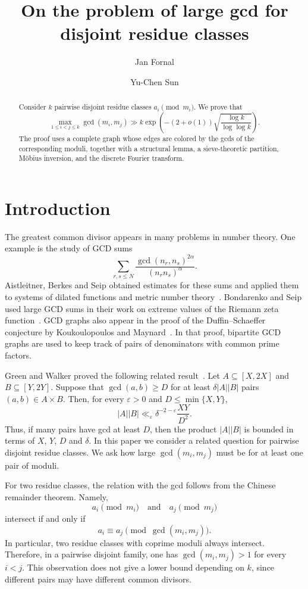 \documentclass[11pt]{amsart}
\title{On the problem of large gcd for disjoint residue classes}
\author{Jan Fornal}
\author{Yu-Chen Sun}
\date{}
\theoremstyle{remark}
\begin{document}
\begin{abstract}
  Consider $k$ pairwise disjoint residue classes $a_i \pmod{m_i}$. We prove
  that
  \[
    \max_{1\leq i<j\leq k}\gcd(m_i,m_j)
    \gg k\exp\!\left(-(2+o(1))
      \sqrt{\frac{\log k}{\log\log k}}\right).
  \]
  The proof uses a complete graph whose edges are colored by the gcds of the
  corresponding moduli, together with a structural lemma, a sieve-theoretic
  partition, M\"obius inversion, and the discrete Fourier transform.
\end{abstract}

\maketitle

\section{Introduction}

The greatest common divisor appears in many problems in number theory.  One
example is the study of GCD sums
\[
  \sum_{r,s\leq N}
  \frac{\gcd(n_r,n_s)^{2\alpha}}{(n_rn_s)^\alpha}.
\]
Aistleitner, Berkes and Seip obtained estimates for these sums and applied
them to systems of dilated functions and metric number
theory~\cite{aistleitner-berkes-seip2015}.  Bondarenko and Seip used large GCD
sums in their work on extreme values of the Riemann zeta
function~\cite{bondarenko-seip2017}.  GCD graphs also appear in the proof of
the Duffin--Schaeffer conjecture by Koukoulopoulos and
Maynard~\cite{koukoulopoulos-maynard2020}.  In that proof, bipartite GCD graphs
are used to keep track of pairs of denominators with common prime factors.

Green and Walker proved the following related result~\cite{green-walker2021}.
Let $A\subseteq[X,2X]$ and $B\subseteq[Y,2Y]$.  Suppose that
$\gcd(a,b)\geq D$ for at least $\delta|A||B|$ pairs
$(a,b)\in A\times B$.  Then, for every $\varepsilon>0$ and
$D\leq\min\{X,Y\}$,
\[
  |A||B|\ll_\varepsilon
  \delta^{-2-\varepsilon}\frac{XY}{D^2}.
\]
Thus, if many pairs have gcd at least $D$, then the product $|A||B|$ is
bounded in terms of $X$, $Y$, $D$ and $\delta$.  In this paper we consider a
related question for pairwise disjoint residue classes.  We ask how large
$\gcd(m_i,m_j)$ must be for at least one pair of moduli.

For two residue classes, the relation with the gcd follows from the Chinese remainder theorem.  Namely,
\[
  a_i\pmod{m_i}\quad\text{and}\quad a_j\pmod{m_j}
\]
intersect if and only if
\[
  a_i\equiv a_j\pmod{\gcd(m_i,m_j)}.
\]
In particular, two residue classes with coprime moduli always intersect.
Therefore, in a pairwise disjoint family, one has
$\gcd(m_i,m_j)>1$ for every $i<j$.  This observation does not give a lower
bound depending on $k$, since different pairs may have different common
divisors.
\end{document}
